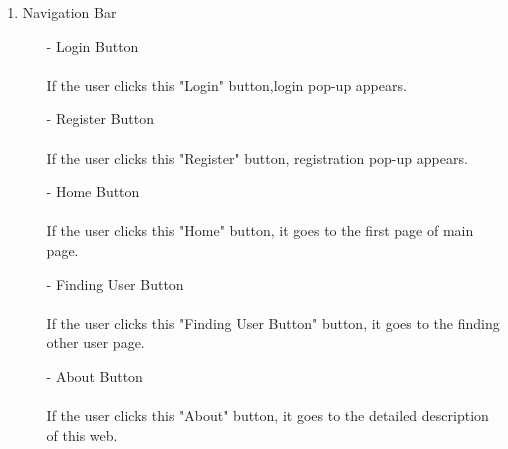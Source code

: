 \documentclass[conference]{IEEEtran}
\begin{document}
\begin{enumerate}
	\item Navigation Bar \\
	\begin{enumerate}
		\item[-]Login Button \\\\
		If the user clicks this "Login" button,login pop-up appears.\\
	\end{enumerate}
	\begin{enumerate}
		\item[-]Register Button \\\\
		If the user clicks this "Register" button, registration pop-up appears.\\
	\end{enumerate}
	\begin{enumerate}
		\item[-]Home Button \\\\
		If the user clicks this "Home" button, it goes to the first page of main page.\\
	\end{enumerate}
	\begin{enumerate}
		\item[-]Finding User Button \\\\
		If the user clicks this "Finding User Button" button, it goes to the finding other user page.\\
	\end{enumerate}
	\begin{enumerate}
		\item[-]About Button \\\\
		If the user clicks this "About" button, it goes to the detailed description of this web.\\
	\end{enumerate}

\end{enumerate}
\end{document}
